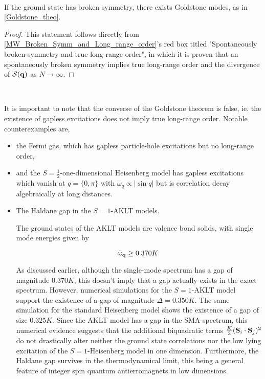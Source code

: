 \blanky \\

\begin{corr}

If the ground state has broken symmetry, there exists Goldstone modes, as in \cref{Goldstone_theo}. 

\end{corr}

\begin{proof}

This statement follows directly from \cref{MW_Broken_Symm_and_Long_range_order}'s red box titled "Spontaneously broken symmetry and true long-range order", in which it is proven that an spontaneously broken symmetry implies true long-range order and the divergence of $\mathcal{S}({\bf q})$ as $N \rightarrow \infty$. 

\end{proof}

\blanky \\

\begin{tcolorbox}[colback = yellow, title = Physical Context]

It is important to note that the converse of the Goldstone theorem is false, ie. the existence of gapless excitations does not imply true long-range order. Notable counterexamples are,

\begin{itemize}
    \item the Fermi gas, which has gapless particle-hole excitations but no long-range order,
    \item and the $S= \frac{1}{2}$-one-dimensional Heisenberg model has gapless excitations which vanish at $q = \{0, \pi\}$ with ${\omega}_{q} \propto |\sin q|$ but is correlation decay algebraically at long distances. 
    \item The Haldane gap in the $S=1$-AKLT models. 
          
          The ground states of the AKLT models are valence bond solids, with single mode energies given by 
          
          $$
              \bar{\omega}_{\bf q} \geq 0.370K.
          $$
          
          As discussed earlier, although the single-mode spectrum has a gap of magnitude $0.370K$, this doesn't imply that a gap actually exists in the exact spectrum. However, numerical simulations for the $S=1$-AKLT model support the existence of a gap of magnitude $\Delta = 0.350K$. The same simulation for the standard Heisenberg model shows the existence of a gap of size $0.325K$. Since the AKLT model has a gap in the SMA-spectrum, this numerical evidence suggests that the additional biquadratic terms $\frac{K}{3} ({\bf S}_i \cdot {\bf S}_j)^2$ do not drastically alter neither the ground state correlations nor the low lying excitation of the $S=1$-Heisenberg model in one dimension. Furthermore, the Haldane gap survives in the thermodynamical limit, this being a general feature of integer spin quantum antierromagnets in low dimensions. 
\end{itemize}

\end{tcolorbox}

